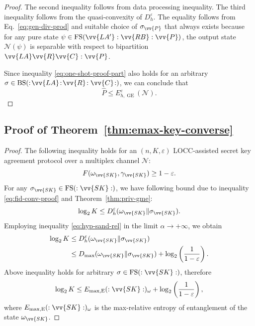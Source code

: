 \documentclass[aps,pra,twocolumn,superscriptaddress,longbibliography]{revtex4-1}
\def\FS{\operatorname{FS}}
\def\GE{\operatorname{GE}}
\def\E{\operatorname{E}}
\def\BS{\operatorname{BS}}
\newcommand{\mc}[1]{\mathcal{#1}}
\begin{document}
\begin{appendix}
\begin{proof}
The second inequality follows from data processing inequality. The third inequality follows from the quasi-convexity of $D^\varepsilon_h$. The equality follows from Eq.~\eqref{eq:gen-div-prod} and suitable choice of $\sigma_{\vv{P}}$ that always exists because for any pure state $\psi\in\FS(\vv{LA'}:\vv{RB}:\vv{P})$, the output state $\mc{N}(\psi)$ is separable with respect to bipartition $\vv{LA}\vv{R}\vv{C}:\vv{P}$. 

Since inequality \eqref{eq:one-shot-proof-part} also holds for an arbitrary $\sigma\in\BS(:\!\vv{LA}\!:\!\vv{R}\!:\vv{C}\!:)$, we can conclude that
\begin{equation}
\hat{P}\leq E^\varepsilon_{h,\GE}(\mc{N}).
\end{equation} 
\end{proof}

\subsection{Proof of Theorem~\ref{thm:emax-key-converse}}\label{app:emax-key-converse}
\begin{proof}
The following inequality holds for an $(n,K,\varepsilon)$ LOCC-assisted secret key agreement protocol over a multiplex channel $\mc{N}$:
\begin{equation}\label{eq:fid-conv-proof}
F(\omega_{\vv{SK}},\gamma_{\vv{SK}})\geq 1-\varepsilon. 
\end{equation}
For any $\sigma_{\vv{SK}}\in\FS(:\vv{SK}:)$, we have following bound due to inequality \eqref{eq:fid-conv-proof} and Theorem~\ref{thm:priv-gme}:
\begin{equation}
\log_2 K\leq D^\varepsilon_h(\omega_{\vv{SK}}\Vert\sigma_{\vv{SK}}). 
\end{equation}
Employing inequality \eqref{eq:hyp-sand-rel} in the limit $\alpha\to+\infty$, we obtain
\begin{align}
\log_2 K &\leq D^\varepsilon_h(\omega_{\vv{SK}}\Vert\sigma_{\vv{SK}}) \\
&\leq D_{\max}(\omega_{\vv{SK}}\Vert\sigma_{\vv{SK}})+\log_2\left(\frac{1}{1-\varepsilon}\right).
\end{align}
Above inequality holds for arbitrary $\sigma\in\FS(:\vv{SK}:)$, therefore
\begin{equation}\label{eq:con-max-proof}
\log_2 K \leq E_{\max,\E}(:\vv{SK}:)_{\omega}+\log_2\left(\frac{1}{1-\varepsilon}\right),
\end{equation}
where $E_{\max,\E}(:\vv{SK}:)_{\omega}$ is the max-relative entropy of entanglement of the state $\omega_{\vv{SK}}$.


\end{proof}
\end{appendix}
\end{document}
